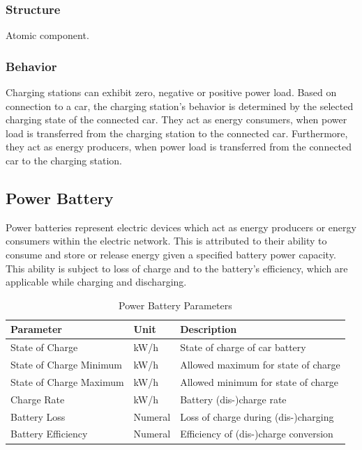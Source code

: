 \subsubsection{Structure}

Atomic component.

\subsubsection{Behavior}

Charging stations can exhibit zero, negative or positive power load. Based on connection to a car, the charging station's behavior is determined by the selected charging state of the connected car. They act as energy consumers, when power load is transferred from the charging station to the connected car. Furthermore, they act as energy producers, when power load is transferred from the connected car to the charging station.

\subsection{Power Battery}
Power batteries represent electric devices which act as energy producers or energy consumers within the electric network.
This is attributed to their ability to consume and store or release energy given a specified battery power capacity. This ability is subject to loss of charge and to the battery's efficiency, which are applicable while charging and discharging. 

\begin{table}[h]
	\renewcommand{\arraystretch}{1.3}
	\caption{Power Battery Parameters}
	\centering
	\begin{tabular}{lll}
		\hline
		\textbf{Parameter}                    & \textbf{Unit} & \textbf{Description} \\ \hline
		State of Charge                       & kW/h          & State of charge of car battery                     \\
		State of Charge Minimum               & kW/h          & Allowed maximum for state of charge                    \\
		State of Charge Maximum               & kW/h          & Allowed minimum for state of charge                     \\
		Charge Rate                  	  	  & kW/h    	  & Battery (dis-)charge rate     \\ 
		Battery Loss                  	  	  & Numeral    	  & Loss of charge during (dis-)charging \\
		Battery Efficiency                    & Numeral    	  & Efficiency of (dis-)charge conversion     \\ \hline
	\end{tabular}
\end{table}

